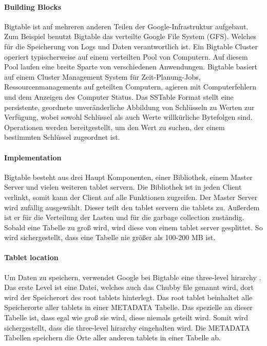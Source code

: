 \paragraph{Building Blocks}
Bigtable ist auf mehreren anderen Teilen der Google-Infrastruktur aufgebaut. Zum Beispiel benutzt Bigtable das verteilte Google File System (GFS). Welches für die Speicherung von Logs und Daten verantwortlich ist. Ein Bigtable Cluster operiert typischerweise auf einem verteilten Pool von Computern. Auf diesem Pool laufen eine breite Sparte von verschiedenen Anwendungen. Bigtable basiert auf einem Cluster Management System für Zeit-Planung-Jobs, Ressourcenmanagements auf geteilten Computern, agieren mit Computerfehlern und dem Anzeigen des Computer Status. Das SSTable Format stellt eine persistente, geordnete unveränderliche Abbildung von Schlüsseln zu Werten zur Verfügung, wobei sowohl Schlüssel als auch Werte willkürliche Bytefolgen sind. Operationen werden bereitgestellt, um den Wert zu suchen, der einem bestimmten Schlüssel zugeordnet ist.

\paragraph{Implementation}
Bigtable besteht aus drei Haupt Komponenten, einer Bibliothek, einem Master Server und vielen weiteren tablet servern. Die Bibliothek ist in jeden Client verlinkt, somit kann der Client auf alle Funktionen zugreifen. Der Master Server wird zufällig ausgewählt. Dieser teilt den tablet servern die tablets zu. Außerdem ist  er für die Verteilung der Lasten  und  für die garbage collection zuständig. Sobald eine Tabelle zu groß wird, wird diese von einem tablet server gesplittet. So wird sichergestellt, dass eine Tabelle nie größer als 100-200 MB ist.

\paragraph{Tablet location}
Um Daten zu speichern, verwendet Google bei Bigtable eine \glqq three-level hirarchy \grqq. Das erste Level ist eine Datei, welches auch das Chubby file genannt wird, dort wird der Speicherort des root tablets hinterlegt. Das root tablet beinhaltet alle Speicherorte aller tablets in einer METADATA Tabelle. Das spezielle an dieser Tabelle ist, dass egal wie groß sie wird, diese niemals geteilt wird. Somit wird sichergestellt, dass die \glqq three-level hirarchy \grqq eingehalten wird. Die METADATA Tabellen speichern die Orte aller anderen tablets in einer Tabelle ab.

